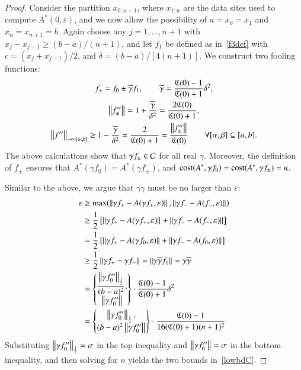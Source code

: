 \documentclass[review]{elsarticle}
\newcommand{\abstol}{\varepsilon}
\theoremstyle{definition}
\newcommand{\tgamma}{\widetilde{\gamma}}
\begin{document}
\begin{proof}
	Consider the partition $x_{0:n+1}$, where $x_{1:n}$ are the data sites
	used to compute $A^*(0,\abstol)$, and we now allow the possibility of $a = x_0=x_1$ and $x_n = x_{n+1} = b$.  Again choose any $j=1, \ldots, n+1$ with $x_j-x_{j-1}
	\ge (b-a)/(n+1)$, and let $f_1$ be defined as in~\eqref{f3def} with $c =
	(x_j+x_{j-1})/2$, and $\delta = (b-a)/[4(n+1)]$. We construct two fooling
	functions:
	\begin{gather*}
	f_{\pm} = f_0 \pm \tgamma f_1, \qquad \tgamma =\frac{\fC(0)-1}{\fC(0)+1}\delta^2, \\
	\norm{f''_{\pm}} = 1+\frac{\tgamma}{\delta^2} = \frac{2\fC(0)}{\fC(0)+1} , \\
\norm[-\infty{[\alpha,\beta]}]{f''} \ge 1-\frac{\tgamma}{\delta^2} = \frac{2}{\fC(0)+1} = \frac{\norm{f''_{\pm}} }{\fC(0)} \qquad \forall [\alpha,\beta] \subseteq [a,b].
	\end{gather*}
	The above calculations show that $\gamma f_{\pm} \in \cc$ for all real
	$\gamma$. Moreover, the definition of $f_{\pm}$ ensures that $A^*(\gamma f_0) =
	A^*(\gamma f_{\pm})$, and $\cost(A^*,\gamma f_0) = \cost(A^*,\gamma f_{\pm}) =
	n$.
	
Similar to the above, we argue that $\gamma\tgamma$ must be no larger than
	$\abstol$:
	\begin{align*}
	\abstol & \ge \max(\norm{\gamma f_+-A(\gamma f_+,\abstol)},\norm{\gamma f_--A(f_-, \abstol)}) \\
	& \ge \frac{1}{2} \left[ \norm{\gamma f_+-A(\gamma f_+,\abstol)}+ \norm{\gamma f_--A(f_-, \abstol)} \right] \\
	& = \frac{1}{2} \left[ \norm{\gamma f_+-A(\gamma f_0,\abstol)}+ \norm{\gamma f_--A(f_0, \abstol)} \right] \\
	& \ge \frac{1}{2}  \norm{\gamma f_+ - \gamma f_-} =  \norm{\gamma \tgamma f_1} = \gamma \tgamma\\
	& = \begin{Bmatrix} \displaystyle
	\frac{\norm[\frac 12]{\gamma f_0''}}{(b-a)^2}, \\
	\norm{\gamma f_0''}
	\end{Bmatrix}  \cdot \frac{\fC(0)-1}{\fC(0)+1} \delta^2\\
	& = \begin{Bmatrix} \displaystyle
	\norm[\frac 12]{\gamma f_0''}, \\
	(b-a)^2\norm{\gamma f_0''}
	\end{Bmatrix}  \cdot \frac{\fC(0)-1}{16(\fC(0)+1)(n+1)^2}
	\end{align*}
	Substituting $\norm[\frac12]{\gamma f_0''} = \sigma$ in the top inequality and
	$\norm{\gamma f_0''} = \sigma$ in the bottom inequality, and then solving for
	$n$ yields the two bounds in~\eqref{lowbdC}.
\end{proof}
\end{document}
